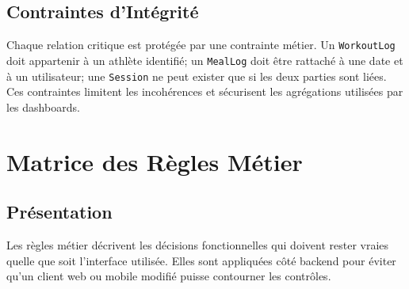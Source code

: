 \section{Contraintes d'Intégrité}
Chaque relation critique est protégée par une contrainte métier. Un \texttt{WorkoutLog} doit appartenir à un athlète identifié; un \texttt{MealLog} doit être rattaché à une date et à un utilisateur; une \texttt{Session} ne peut exister que si les deux parties sont liées. Ces contraintes limitent les incohérences et sécurisent les agrégations utilisées par les dashboards.

\chapter{Matrice des Règles Métier}
\minitoc
\newpage

\section{Présentation}
Les règles métier décrivent les décisions fonctionnelles qui doivent rester vraies quelle que soit l'interface utilisée. Elles sont appliquées côté backend pour éviter qu'un client web ou mobile modifié puisse contourner les contrôles.

